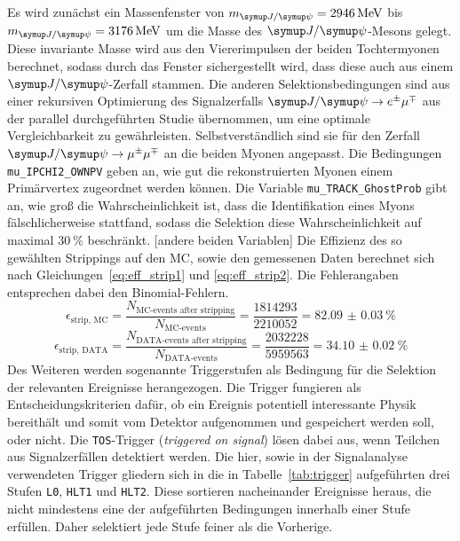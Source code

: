 Es wird zunächst ein Massenfenster von $m_{\jpsi}=\SI{2946}{\mega\electronvolt}$ bis $m_{\jpsi}=\SI{3176}{\mega\electronvolt}$ um die Masse des $\jpsi$-Mesons gelegt. Diese invariante Masse wird aus den Viererimpulsen der beiden Tochtermyonen berechnet, sodass durch das Fenster sichergestellt wird, dass diese auch aus einem $\jpsi$-Zerfall stammen. Die anderen Selektionsbedingungen sind aus einer rekursiven Optimierung des Signalzerfalls $\signal$ aus der parallel durchgeführten Studie \cite{ba-maik} übernommen, um eine optimale Vergleichbarkeit zu gewährleisten. Selbstverständlich sind sie für den Zerfall $\kontroll$ an die beiden Myonen angepasst.
Die Bedingungen \texttt{mu\pm\_IPCHI2\_OWNPV} geben an, wie gut die rekonstruierten Myonen einem Primärvertex zugeordnet werden können. Die Variable \texttt{mu\pm\_TRACK\_GhostProb} gibt an, wie groß die Wahrscheinlichkeit ist, dass die Identifikation eines Myons fälschlicherweise stattfand, sodass die Selektion diese Wahrscheinlichkeit auf maximal $\SI{30}{\percent}$ beschränkt. [andere beiden Variablen] Die Effizienz des so gewählten Strippings auf den MC, sowie den gemessenen Daten berechnet sich nach Gleichungen~\ref{eq:eff_strip1} und \ref{eq:eff_strip2}. Die Fehlerangaben entsprechen dabei den Binomial-Fehlern.
%
\begin{equation}
  \epsilon_\text{strip, MC}=\frac{N_\text{MC-events after stripping}}{N_\text{MC-events}}=\frac{1814293}{2210052}=\SI{82.09(3)}{\percent}
  \label{eq:eff_strip1}
\end{equation}
\begin{equation}
  \epsilon_\text{strip, DATA}=\frac{N_\text{DATA-events after stripping}}{N_\text{DATA-events}}=\frac{2032228}{5959563}=\SI{34.10(2)}{\percent}
  \label{eq:eff_strip2}
\end{equation}
%
Des Weiteren werden sogenannte Triggerstufen als Bedingung für die Selektion der relevanten Ereignisse herangezogen. Die Trigger fungieren als Entscheidungskriterien dafür, ob ein Ereignis potentiell interessante Physik bereithält und somit vom Detektor aufgenommen und gespeichert werden soll, oder nicht. Die \texttt{TOS}-Trigger (\textit{triggered on signal}) lösen dabei aus, wenn Teilchen aus Signalzerfällen detektiert werden. Die hier, sowie in der Signalanalyse \cite{ba-maik} verwendeten Trigger gliedern sich in die in Tabelle~\ref{tab:trigger} aufgeführten drei Stufen \texttt{L0}, \texttt{HLT1} und \texttt{HLT2}. Diese sortieren nacheinander Ereignisse heraus, die nicht mindestens eine der aufgeführten Bedingungen innerhalb einer Stufe erfüllen. Daher selektiert jede Stufe feiner als die Vorherige.
